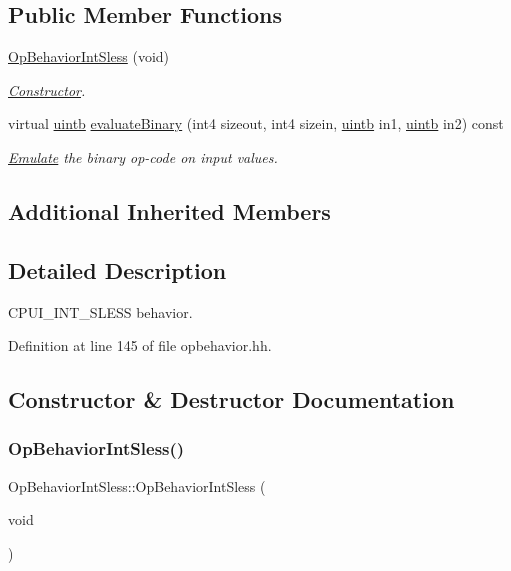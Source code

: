 \subsection*{Public Member Functions}
\begin{DoxyCompactItemize}
\item 
\mbox{\hyperlink{class_op_behavior_int_sless_a1062cbee5133f99b42af723394d291e6}{Op\+Behavior\+Int\+Sless}} (void)
\begin{DoxyCompactList}\small\item\em \mbox{\hyperlink{class_constructor}{Constructor}}. \end{DoxyCompactList}\item 
virtual \mbox{\hyperlink{types_8h_a2db313c5d32a12b01d26ac9b3bca178f}{uintb}} \mbox{\hyperlink{class_op_behavior_int_sless_ad7f85ed60f2283fbfa1ae89e15df2dc3}{evaluate\+Binary}} (int4 sizeout, int4 sizein, \mbox{\hyperlink{types_8h_a2db313c5d32a12b01d26ac9b3bca178f}{uintb}} in1, \mbox{\hyperlink{types_8h_a2db313c5d32a12b01d26ac9b3bca178f}{uintb}} in2) const
\begin{DoxyCompactList}\small\item\em \mbox{\hyperlink{class_emulate}{Emulate}} the binary op-\/code on input values. \end{DoxyCompactList}\end{DoxyCompactItemize}
\subsection*{Additional Inherited Members}


\subsection{Detailed Description}
C\+P\+U\+I\+\_\+\+I\+N\+T\+\_\+\+S\+L\+E\+SS behavior. 

Definition at line 145 of file opbehavior.\+hh.



\subsection{Constructor \& Destructor Documentation}
\mbox{\label{class_op_behavior_int_sless_a1062cbee5133f99b42af723394d291e6}} 
\subsubsection{\texorpdfstring{OpBehaviorIntSless()}{OpBehaviorIntSless()}}
{\footnotesize\ttfamily Op\+Behavior\+Int\+Sless\+::\+Op\+Behavior\+Int\+Sless (\begin{DoxyParamCaption}\item[{void}]{ }\end{DoxyParamCaption})\hspace{0.3cm}{\ttfamily [inline]}}



